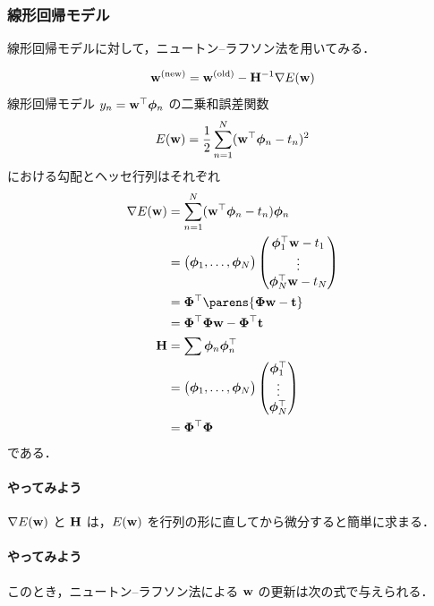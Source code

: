 \subsubsection*{線形回帰モデル}

線形回帰モデルに対して，ニュートン--ラフソン法を用いてみる．

\begin{equation}
  {\mathbf{w}}^{\text{(new)}} = {\mathbf{w}}^{\text{(old)}} - {\mathbf{H}}^{-1} \nabla E({\mathbf{w}})
\end{equation}
線形回帰モデル $y_n = {\mathbf{w}}^\top\boldsymbol{\phi}_n$ の二乗和誤差関数
\[
  E({\mathbf{w}}) = \frac{1}{2} \sum_{n = 1}^N ({\mathbf{w}}^\top\boldsymbol{\phi}_n - t_n)^2
\]
における勾配とヘッセ行列はそれぞれ
\begin{align}
  \nabla E(\vw) &= \sum_{n=1}^N (\vw\trans\vphi_n - t_n) \vphi_n \notag \\
  & = \pmatrixin{\vphi_1,\dots,\vphi_N} \pmatrixin{\vphi_1\trans \vw - t_1 \\ \vdots \\ \vphi_N\trans \vw - t_N} \notag \\
  & = \mPhi\trans \parens{\mPhi\vw - \vt} \notag \\
  & = \mPhi\trans \mPhi \vw - \mPhi\trans \vt \\
  \vH & = \sum \vphi_n \vphi_n\trans \notag \\
  & = \pmatrixin{\vphi_1,\dots,\vphi_N} \pmatrixin{\vphi_1\trans \\ \vdots \\ \vphi_N\trans} \notag \\
  & = \mPhi\trans \mPhi
\end{align}
である．

\paragraph{やってみよう} $\nabla E({\mathbf{w}})$ と ${\mathbf{H}}$ は，$E({\mathbf{w}})$ を行列の形に直してから微分すると簡単に求まる．
\vspace{9em}

\paragraph{やってみよう} このとき，ニュートン--ラフソン法による ${\mathbf{w}}$ の更新は次の式で与えられる．

